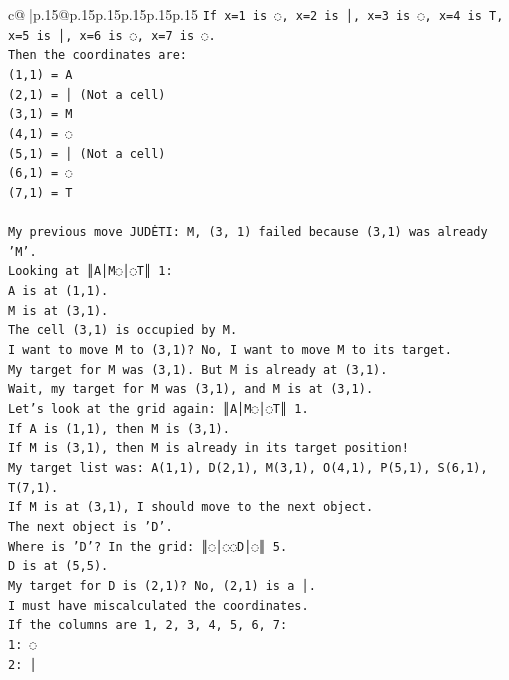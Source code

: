 \documentclass{article}
\begin{document}
{\begin{supertabular}{c@{$\;$}|p{.15\linewidth}@{}p{.15\linewidth}p{.15\linewidth}p{.15\linewidth}p{.15\linewidth}p{.15\linewidth}}
{{{\texttt{If x=1 is ◌, x=2 is │, x=3 is ◌, x=4 is T, x=5 is │, x=6 is ◌, x=7 is ◌.} \\
\texttt{Then the coordinates are:} \\
\texttt{(1,1) = A} \\
\texttt{(2,1) = │ (Not a cell)} \\
\texttt{(3,1) = M} \\
\texttt{(4,1) = ◌} \\
\texttt{(5,1) = │ (Not a cell)} \\
\texttt{(6,1) = ◌} \\
\texttt{(7,1) = T} \\
\\ 
\texttt{My previous move JUDĖTI: M, (3, 1) failed because (3,1) was already 'M'.} \\
\texttt{Looking at ║A│M◌│◌T║ 1:} \\
\texttt{A is at (1,1).} \\
\texttt{M is at (3,1).} \\
\texttt{The cell (3,1) is occupied by M.} \\
\texttt{I want to move M to (3,1)? No, I want to move M to its target.} \\
\texttt{My target for M was (3,1). But M is already at (3,1).} \\
\texttt{Wait, my target for M was (3,1), and M is at (3,1).} \\
\texttt{Let's look at the grid again: ║A│M◌│◌T║ 1.} \\
\texttt{If A is (1,1), then M is (3,1).} \\
\texttt{If M is (3,1), then M is already in its target position!} \\
\texttt{My target list was: A(1,1), D(2,1), M(3,1), O(4,1), P(5,1), S(6,1), T(7,1).} \\
\texttt{If M is at (3,1), I should move to the next object.} \\
\texttt{The next object is 'D'.} \\
\texttt{Where is 'D'? In the grid: ║◌│◌◌D│◌║ 5.} \\
\texttt{D is at (5,5).} \\
\texttt{My target for D is (2,1)? No, (2,1) is a │.} \\
\texttt{I must have miscalculated the coordinates.} \\
\texttt{If the columns are 1, 2, 3, 4, 5, 6, 7:} \\
\texttt{1: ◌} \\
\texttt{2: │} \\
}}}
\end{supertabular}}
\end{document}
